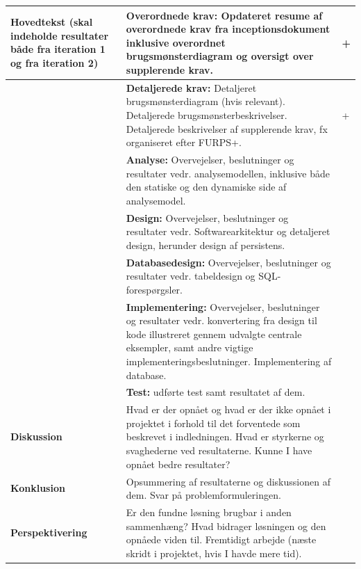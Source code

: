 \begin{longtable}{|p{30mm}|p{90mm}|p{25mm}|}
\textbf{Hovedtekst}
(skal indeholde resultater både fra iteration 1 og fra iteration 2)
    & \textbf{Overordnede krav:}
    Opdateret resume af overordnede krav fra inceptionsdokument inklusive overordnet brugsmønsterdiagram og oversigt over supplerende krav.
                                    &   +         \\ \hline
    & \textbf{Detaljerede krav:}
    Detaljeret brugsmønsterdiagram (hvis relevant).
    Detaljerede brugsmønsterbeskrivelser.
    Detaljerede beskrivelser af supplerende krav, fx organiseret efter FURPS+.
                                        &   +         \\ \hline
    & \textbf{Analyse:} 
    Overvejelser, beslutninger og resultater vedr. analysemodellen, inklusive både den statiske og den dynamiske side af analysemodel. 
                                        &           \\ \hline
    & \textbf{Design:}
    Overvejelser, beslutninger og resultater vedr. Softwarearkitektur og detaljeret design, herunder design af persistens. 
                                        &           \\ \hline
    & \textbf{Databasedesign:}
    Overvejelser, beslutninger og resultater vedr. tabeldesign og SQL-forespørgsler.
                                        &           \\ \hline
    & \textbf{Implementering:}
    Overvejelser, beslutninger og resultater vedr.  konvertering fra design til kode illustreret gennem udvalgte centrale eksempler, samt andre vigtige implementeringsbeslutninger. 
    Implementering af database.
                                        &           \\ \hline
    & \textbf{Test:}
    udførte test samt resultatet af dem.
                                        &           \\ \hline

\textbf{Diskussion} & Hvad er der opnået og hvad er der ikke opnået i projektet i forhold til det forventede som beskrevet i indledningen. 
Hvad er styrkerne og svaghederne ved resultaterne.
Kunne I have opnået bedre resultater?
                                        &           \\ \hline

\textbf{Konklusion} & Opsummering af resultaterne og diskussionen af dem. Svar på problemformuleringen. 
                                        &           \\ \hline

\textbf{Perspektivering}   & Er den fundne løsning brugbar i anden sammenhæng?
Hvad bidrager løsningen og den opnåede viden til. 
Fremtidigt arbejde (næste skridt i projektet, hvis I havde mere tid).
                                        &           \\ \hline


\end{longtable}
